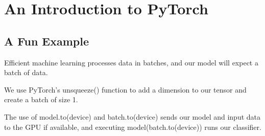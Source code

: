 \chapter{An Introduction to PyTorch\label{Ch01}}

\section{A Fun Example}
Efficient machine learning processes data in batches, and our model will expect a batch of data.

We use PyTorch's \textsf{unsqueeze()} function to add a dimension to
our tensor and create a batch of size 1.

The use of \textsf{model.to(device)} and
\textsf{batch.to(device)} sends our model and input data to the GPU
if available, and executing \textsf{model(batch.to(device))} runs our
classifier.